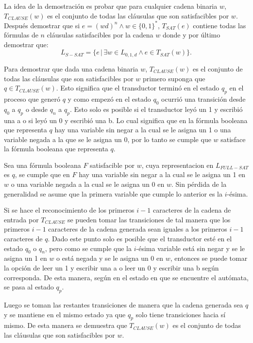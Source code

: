 La idea de la demostración es probar que para cualquier cadena binaria $w$, $T_{CLAUSE}(w)$ es el conjunto de
todas las cláusulas que son satisfacibles por $w$. Después demostrar que si $e=(wd)^n \wedge w\in\{0,1\}^*$, $T_{SAT}(e)$ contiene todas
las fórmulas de $n$ cláusulas satisfacibles por la cadena $w$ donde  y por último demostrar que:
$$L_{S-SAT} = \{e\,|\,\exists w \in L_{0,1,d} \wedge e \in T_{SAT}(w) \}.$$

Para demostrar que dada una cadena binaria $w$, $T_{CLAUSE}(w)$ es el conjunto de todas las
cláusulas que son satisfacibles por $w$ primero suponga que $q\in T_{CLAUSE}(w)$.
Esto significa que el transductor terminó en el estado $q_p$ en el proceso que generó $q$ y como empezó
en el estado $q_0$ ocurrió una transición desde $q_0$ a $q_p$ o desde $q_n$ a $q_p$. Esto solo es posible
si el transductor leyó un 1 y escribió una a o si leyó un 0 y escribió una b. Lo cual significa que en la fórmula booleana que representa $q$
hay una variable sin negar a la cual se le asigna un 1 o una variable negada a la
que se le asigna un 0, por lo tanto se cumple que $w$ satisface la fórmula booleana que representa $q$.

Sea una fórmula booleana $F$ satisfacible por $w$, cuya representacion en $L_{FULL-SAT}$ es $q$,  se cumple que
en $F$ hay una variable sin negar a la cual se le asigna un 1 en $w$
o una variable negada a la cual se le asigna un 0 en $w$. Sin pérdida de la generalidad se asume que la primera variable que cumple lo anterior es la $i$-ésima.

Si se hace el reconocimiento de los primeros $i-1$ caracteres de la cadena de entrada por $T_{CLAUSE}$ se pueden
tomar las transiciones de tal manera que los primeros $i-1$ caracteres de la cadena generada sean iguales a los primeros $i-1$ caracteres de $q$.
Dado este punto solo es posible que el transductor esté en el estado $q_0$ o $q_n$, pero como se cumple que la
$i$-ésima variable está sin negar y se le asigna un 1 en $w$ o está negada y se le asigna un 0 en $w$, entonces se puede
tomar la opción de leer un 1 y escribir una a o leer un 0 y escribir una b según corresponda.
De esta manera, según en el estado en que se encuentre el autómata, se pasa al estado $q_p$.

Luego se toman las restantes transiciones de manera que la cadena generada sea $q$ y se mantiene en el mismo
estado ya que $q_p$ solo tiene transiciones hacia sí mismo. De esta manera se demuestra que $T_{CLAUSE}(w)$
es el conjunto de todas las cláusulas que son satisfacibles por $w$.

